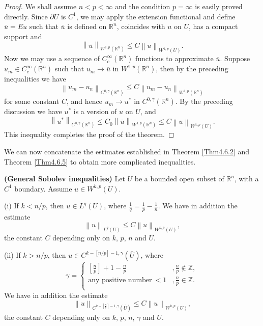 \begin{proof}
We shall assume $n<p<\infty$ and the condition $p=\infty$ is easily proved directly. Since $\partial U$ is $C^1$, we may apply the extension functional and define $\overline{u}=Eu$ such that $\overline{u}$ is defined on $\mathbb{R}^n$, coincides with $u$ on $U$, has a compact support and 
$$
\left\| \overline{u} \right\| _{W^{1,p}\left( \mathbb{R} ^n \right)}\le C\left\| u \right\| _{W^{1,p}\left( U \right)}.
$$
Now we may use a sequence of $C_c^\infty(\mathbb{R}^n)$ functions to approximate $\overline{u}$. Suppose $u_m\in C_c^\infty(\mathbb{R}^n)$ such that $u_m\to \overline{u}$ in $W^{1,p}(\mathbb{R}^n)$, then by the preceding inequalities we have 
$$
\left\| u_m-u_n \right\| _{C^{0,\gamma}\left( \mathbb{R} ^n \right)}\le C\left\| u_m-u_n \right\| _{W^{1,p}\left( \mathbb{R} ^n \right)}
$$
for some constant $C$, and hence $u_m\to u^*$ in $C^{0,\gamma}(\mathbb{R}^n)$. By the preceding discussion we have $u^*$ is a version of $u$ on $U$, and 
$$
\left\| u^* \right\| _{C^{0,\gamma}\left( \mathbb{R} ^n \right)}\le C_0\left\| \overline{u} \right\| _{W^{1,p}\left( \mathbb{R} ^n \right)}\le C\left\| u \right\| _{W^{1,p}\left( U \right)}.
$$
This inequality completes the proof of the theorem.
\end{proof}
We can now concatenate the estimates established in Theorem \ref{Thm4.6.2} and Theorem \ref{Thm4.6.5} to obtain more complicated inequalities.
\begin{theorem}{\textbf{(General Sobolev inequalities)}}
Let $U$ be a bounded open subset of $\mathbb{R}^n$, with a $C^1$ boundary. Assume $u\in W^{k,p}(U)$.\par
(i) If $k<n/p$, then $u\in L^q(U)$, where $\frac{1}{q}=\frac{1}{p}-\frac{1}{n}$. We have in addition the estimate 
\begin{equation}\label{4.8}
\left\| u \right\| _{L^q\left( U \right)}\le C\left\| u \right\| _{W^{k,p}\left( U \right)},
\end{equation}
the constant $C$ depending only on $k$, $p$, $n$ and $U$.\par
(ii) If $k>n/p$, then $u\in C^{k-[n/p]-1,\gamma}(\overline{U})$, where 
$$
\gamma =\left\{ \begin{aligned}
	\left[ \frac{n}{p} \right] +1-\frac{n}{p}&,\frac{n}{p}\notin \mathbb{Z} ,\\
	\text{any positive number}\ <1&,\frac{n}{p}\in \mathbb{Z} .\\
\end{aligned} \right. 
$$
We have in addition the estimate 
$$
\left\| u \right\| _{C^{k-\left[ \frac{n}{p} \right] -1,\gamma}(\overline{U})}\le C\left\| u \right\| _{W^{k,p}\left( U \right)},
$$
the constant $C$ depending only on $k$, $p$, $n$, $\gamma$ and $U$.
\end{theorem}

